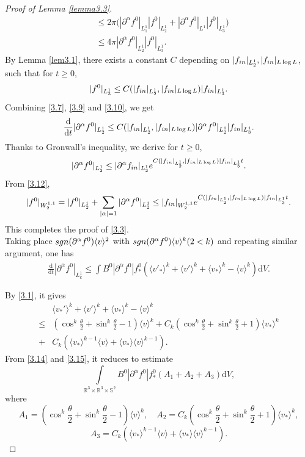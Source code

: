 \documentclass[10pt,a4paper]{amsart}
\def\pa{\partial}
\def\th{\theta}
\let\al=\alpha
\newcommand{\beno}{\begin{eqnarray*}}
\newcommand{\ben}{\begin{eqnarray}}
\newcommand{\beq}{\begin{equation}}
\newcommand{\eeno}{\end{eqnarray*}}
\newcommand{\een}{\end{eqnarray}}
\newcommand{\eeq}{\end{equation}}
\begin{document}
\begin{proof}[Proof of Lemma \ref{lemma3.3}]
\begin{equation}
\begin{aligned}
    &\le 2\pi\Big(|\pa^{\al}f^{0}|_{L^1_1}|f^0|_{L^1_2}+|\pa^{\al}f^{0}|_{L^1}|f^0|_{L^1_3} \Big)\\
    &\le 4\pi |\pa^{\al}f^{0}|_{L^1_2}|f^0|_{L^1_3}.
    \end{aligned}
    \end{equation}
    By Lemma \ref{lem3.1}, there exists a constant $C$ depending on $|f_{\textup{in}}|_{L^1_2},|f_{\textup{in}}|_{L\log L}$, such that for $t\ge0$,
    \ben\label{3.10}
|f^0|_{L^1_3}\le C(|f_{\textup{in}}|_{L^1_2},|f_{\textup{in}}|_{L\log L})|f_{\textup{in}}|_{L^1_3}.
    \een
    Combining \eqref{3.7}, \eqref{3.9} and \eqref{3.10}, we get
    \beno
\frac{\mathrm{d}}{\mathrm{d}t}|\pa^{\al}f^{0}|_{L^1_2}\le C(|f_{\textup{in}}|_{L^1_2},|f_{\textup{in}}|_{L\log L})|\pa^{\al}f^{0}|_{L^1_2}|f_{\textup{in}}|_{L^1_3}.
    \eeno
    Thanks to Gronwall's inequality, we derive for $t\ge 0$,
    \ben\label{3.12}
|\pa^{\al}f^{0}|_{L^1_2}\le |\pa^{\al}f_{\textup{in}}|_{L^1_2}e^{C(|f_{\textup{in}}|_{L^1_2},|f_{\textup{in}}|_{L\log L})|f_{\textup{in}}|_{L^1_3}t}.
    \een
    From \eqref{3.12}, 
    \beno
|f^0|_{W^{1,1}_2}= |f^0|_{L^1_2}+ \sum\limits_{|\al|=1}|\pa^{\al}f^{0}|_{L^1_2}\le |f_{\textup{in}}|_{W^{1,1}_2}e^{C(|f_{\textup{in}}|_{L^1_2},|f_{\textup{in}}|_{L\log L})|f_{\textup{in}}|_{L^1_3}t}.
    \eeno
    This completes the proof of \eqref{3.3}.\\ 
    Taking place $\textup{sgn}(\pa^{\al}f^0)\langle v\rangle^2$ with $\textup{sgn}(\pa^{\al}f^0)\langle v\rangle^{k}(2< k)$ and repeating similar argument, one has
    \ben\label{3.14}
    \frac{\mathrm{d}}{\mathrm{d}t}|\pa ^{\al}f^0|_{L^1_{k}}\le\int B^0|\pa^{\al}f^{0}|f^0_*(\langle v'_*\rangle^{k}+\langle v'\rangle^{k}+\langle v_*\rangle^{k}-\langle v\rangle^{k})\mathrm{d}V.
    \een
    
   
    By \eqref{3.1}, it gives
    \beq\label{3.15}
    \begin{aligned}
        &\langle v_*'\rangle^{k}+\langle v'\rangle^{k}+\langle v_*\rangle^{k}-\langle v\rangle^{k}\\
        \le& (\cos^{k}\frac{\th}{2}+\sin^{k}\frac{\th}{2}-1)\langle v\rangle^{k}+C_k(\cos^{k}\frac{\th}{2}+\sin^{k}\frac{\th}{2}+1)\langle v_*\rangle^{k}
        \\
        +&C_k(\langle v_*\rangle^{k-1}\langle v\rangle+\langle v_*\rangle\langle v\rangle^{k-1}).
    \end{aligned}
    \eeq
    From \eqref{3.14} and \eqref{3.15}, it reduces to estimate
    $$\int\limits_{\mathbb{R}^3\times\mathbb{R}^3\times\mathbb{S}^2}B^0|\pa^{\al}f^{0}|f^0_*(A_1+A_2+A_3)\mathrm{d}V,$$
    where 
    $$A_1=(\cos^{k}\frac{\th}{2}+\sin^{k}\frac{\th}{2}-1)\langle v\rangle^{k},\quad A_2=C_k(\cos^{k}\frac{\th}{2}+\sin^{k}\frac{\th}{2}+1)\langle v_*\rangle^{k},$$
    $$A_3=C_k(\langle v_*\rangle^{k-1}\langle v\rangle+\langle v_*\rangle\langle v\rangle^{k-1}).$$
   

\end{proof}
\end{document}
